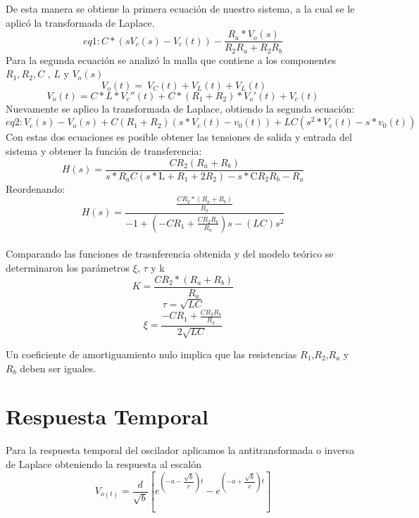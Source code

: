 \documentclass[10pt,a4paper]{article} %
\begin{document}
De esta manera se obtiene la primera ecuación de nuestro sistema, a la cual se le aplicó la transformada de Laplace. 
\begin{equation}
eq1:C* (s V_{c}(s)-V_{c}(t))-\frac{R_{a}* V_{o}(s)}{R_{2} R_{a} +R_{2} R_{b}}
\end{equation}
Para la segunda ecuación se analizó la malla que contiene a los componentes $R_{1},R_{2}, C$ , $L$ y $V_{o}(s)$ 
\begin{equation}
\ V_{o}(t)=\ V_{C}(t)+ V_{L}(t)+ V_{L}(t)
\end{equation}
\begin{equation}
V_{o}(t)=C*L*V_{c}''(t)+ C*(R_{1}+R_{2})*V_{o}'(t)+V_{c}(t)
\end{equation}
Nuevamente se aplico la transformada de Laplace, obtiendo la segunda ecuación:
\begin{equation}
eq2 : V_{c}(s) - V_{o}(s) + C(R_{1} + R_{2})(s*V_{c}(t) - v_{0}(t)) + 
LC(s^{2}*V_{c}(t) - s*v_{0}(t))
\end{equation}
Con estas dos ecuaciones es posible obtener las tensiones de salida y entrada del sistema y obtener la función de transferencia:
\begin{equation}
H(s)=\frac{C R_{2} (R_{a}+R_{b})}{s*R_{a}C (s*\text{L} +R_{1}+2 R_{2})-s*\text{C}R_{2} R_{b} -R_{a}}
\end{equation}
Reordenando:
\begin{equation}
H(s)=\frac{\frac{CR_{2}*(R_{a}+R_{b})}{R_{a}}}{-1+(-CR_{1}+\frac{CR_{2}R_{b}}{R_{a}})s-(LC)s^{2}}
\end{equation}
\\
Comparando las funciones de trasnferencia obtenida y del modelo teórico se determinaron los parámetros $\xi$, $\tau$ y k 
\begin{equation}
K=\frac{CR_{2}*(R_{a}+R_{b})}{R_{a}}
\end{equation}
\begin{equation}
\tau=\sqrt{LC}
\end{equation}
\begin{equation}
\xi=\dfrac{-CR_{1}+\frac{CR_{2}R_{b}}{R_{a}}}{2\sqrt{LC}}
\end{equation}

Un coeficiente de amortiguamiento nulo implica que las resistencias $R_1$,$R_2$,$R_a$ y $R_b$ deben ser iguales. 


\section{Respuesta Temporal}
Para la respuesta temporal del oscilador aplicamos la antitransformada o inversa de Laplace obteniendo la respuesta al escalón
\begin{equation}
    V_{o(t)}=\frac{d}{\sqrt{b}}\left[e^{\left(-a-\dfrac{\sqrt{b}}{c}\right)t}-e^{\left(-a+\dfrac{\sqrt{b}}{c}\right)t}\right]
\end{equation}
\end{document}
